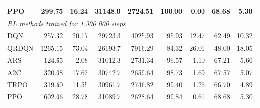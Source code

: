 \begin{samepage}
\begin{center}
\begin{tabular}{l|rr|rr|rr|rr}
    PPO          &   299.75 &    16.24 &    31148.0 &    2724.51 &  100.00 &    0.00 &   68.68 &    5.30 \\
    \midrule
    \multicolumn{9}{l}{\textit{RL methods trained for 1.000.000 steps}} \\
    \midrule
    DQN          &   257.32 &    20.17 &    29723.3 &    4025.93 &   95.93 &   12.47 &   62.49 &   10.32 \\
    QRDQN        &  1265.15 &    73.04 &    26193.7 &    7916.29 &   84.32 &   26.01 &   48.00 &   18.05 \\
    ARS          &   124.65 &     2.08 &    31012.3 &    2731.34 &   99.57 &    1.10 &   67.21 &    5.66 \\
    A2C          &   320.08 &    17.63 &    30742.7 &    2659.64 &   98.73 &    1.69 &   67.57 &    5.07 \\
    TRPO         &   319.60 &    11.55 &    30961.7 &    2746.82 &   99.40 &    1.26 &   66.70 &    4.89 \\
    PPO          &   602.06 &    28.78 &    31089.7 &    2628.64 &   99.84 &    0.61 &   68.68 &    5.30 \\
    \bottomrule
  \end{tabular}
\end{center}
\end{samepage}

